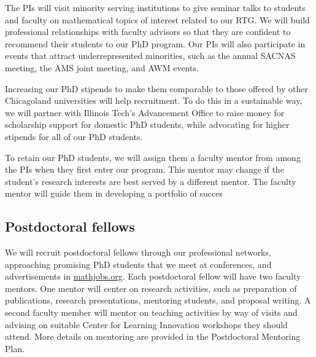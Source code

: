 \documentclass[11pt]{NSFamsart}
\begin{document}

The PIs will visit minority serving institutions to give seminar talks to students and faculty on mathematical topics of interest related to our RTG.  We will build professional relationships with faculty advisors so that they are confident to recommend their students to our PhD program.  Our PIs will also participate in events that attract underrepresented minorities, such as the annual SACNAS meeting, the AMS joint meeting, and AWM events.

Increasing our PhD stipends to make them comparable to those offered by other Chicagoland universities will help recruitment. To do this in a sustainable way, we will partner with Illinois Tech's Advancement Office to raise money for scholarship support for domestic PhD students, while advocating for higher stipends for all of our PhD students.

To retain our PhD students, we will assign them a faculty mentor from among the PIs when they first enter our program.  This mentor may change if the student's research interests are best served by a different mentor.  The faculty mentor will guide them in developing a portfolio of succes



\subsection*{Postdoctoral fellows}
We will recruit postdoctoral fellows through our professional networks, approaching promising PhD students that we meet at conferences, and advertisements in \url{mathjobs.org}. Each postdoctoral fellow will have two faculty mentors. One mentor will center on research activities, such as preparation of 
publications, research presentations, mentoring students, and proposal writing. A second faculty member will mentor on teaching activities by way of visits and advising on suitable Center for Learning Innovation workshops they should attend. More details on mentoring are provided in the Postdoctoral Mentoring Plan.
\end{document}
